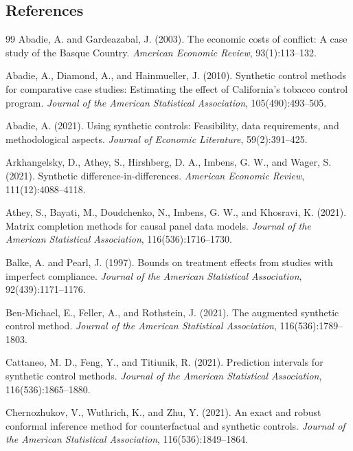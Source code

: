 \documentclass[11pt]{article}
\theoremstyle{definition}
\theoremstyle{plain}
\theoremstyle{remark}
\begin{document}
\subsection*{References}
\begin{thebibliography}{99}
Abadie, A. and Gardeazabal, J. (2003).
The economic costs of conflict: A case study of the Basque Country.
\emph{American Economic Review}, 93(1):113--132.

Abadie, A., Diamond, A., and Hainmueller, J. (2010).
Synthetic control methods for comparative case studies: Estimating the effect
of California's tobacco control program.
\emph{Journal of the American Statistical Association}, 105(490):493--505.

Abadie, A. (2021).
Using synthetic controls: Feasibility, data requirements, and methodological
aspects.
\emph{Journal of Economic Literature}, 59(2):391--425.

Arkhangelsky, D., Athey, S., Hirshberg, D. A., Imbens, G. W., and Wager, S.
(2021).
Synthetic difference-in-differences.
\emph{American Economic Review}, 111(12):4088--4118.

Athey, S., Bayati, M., Doudchenko, N., Imbens, G. W., and Khosravi, K. (2021).
Matrix completion methods for causal panel data models.
\emph{Journal of the American Statistical Association}, 116(536):1716--1730.

Balke, A. and Pearl, J. (1997).
Bounds on treatment effects from studies with imperfect compliance.
\emph{Journal of the American Statistical Association}, 92(439):1171--1176.

Ben-Michael, E., Feller, A., and Rothstein, J. (2021).
The augmented synthetic control method.
\emph{Journal of the American Statistical Association}, 116(536):1789--1803.

Cattaneo, M. D., Feng, Y., and Titiunik, R. (2021).
Prediction intervals for synthetic control methods.
\emph{Journal of the American Statistical Association}, 116(536):1865--1880.

Chernozhukov, V., Wuthrich, K., and Zhu, Y. (2021).
An exact and robust conformal inference method for counterfactual and synthetic
controls.
\emph{Journal of the American Statistical Association}, 116(536):1849--1864.


\end{thebibliography}
\end{document}
